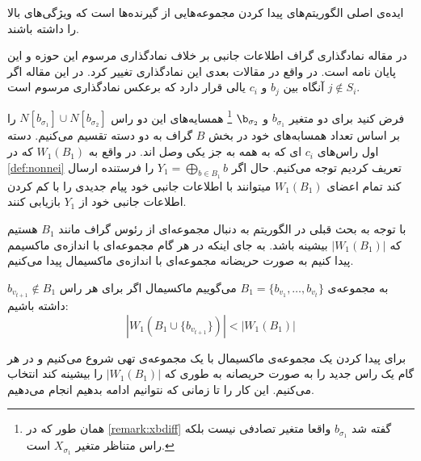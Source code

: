 ایده‌ی اصلی الگوریتم‌های
 پیدا کردن مجموعه‌هایی از گیرنده‌ها است که ویژگی‌های بالا را داشته باشند.
 
 \begin{remark}
 	در مقاله
 	\cite{pliablefirstpaper}
 	نمادگذاری گراف اطلاعات جانبی بر خلاف نمادگذاری مرسوم این حوزه و این پایان نامه است. در واقع در مقالات بعدی این نمادگذاری تغییر کرد. در این مقاله اگر
 	$j \notin S_i$
 	آنگاه بین
 	$b_j$
 	و
 	$c_i$
 	یالی قرار دارد که برعکس نمادگذاری مرسوم است.
 \end{remark}
 
 فرض کنید برای دو متغیر
 $b_{\sigma_1}$
 و
 $\b_{\sigma_2}$
 \footnote{
 همان طور که در
 \autoref{remark:xbdiff}
 گفته شد 
 $b_{\sigma_1}$
 واقعا متغیر تصادفی نیست بلکه راس متناظر متغیر
 $X_{\sigma_1}$
 است.
 }
 همسایه‌های این دو راس
 $N[b_{\sigma_1}] \cup N[b_{\sigma_2}]$
 را بر اساس تعداد همسابه‌های خود در بخش
 $B$
 گراف به دو دسته تقسیم می‌کنیم. دسته اول راس‌های
 $c_i$
 ای که به همه به جز یکی وصل اند. در واقع به
 $W_1(B_1)$
 که در
 \autoref{def:nonnei}
 تعریف کردیم توجه می‌کنیم.  حال اگر
  $Y_1 = \bigoplus\limits_{b \in B_1} b$
  را فرستنده ارسال کند تمام اعضای
  $W_1(B_1)$
  میتوانند با اطلاعات جانبی خود پیام جدیدی را با کم کردن اطلاعات جانبی خود از
  $Y_1$
  بازیابی کنند.
  
 با توجه به بحث قبلی در الگوریتم
\GRCOVone
به دنبال مجموعه‌ای از رئوس گراف مانند
$B_1$
هستیم که 
$|W_1(B_1)|$
بیشینه باشد. به جای اینکه در هر گام مجموعه‌ای با اندازه‌ی ماکسیمم پیدا کنیم به صورت حریضانه مجموعه‌ای با اندازه‌ی ماکسیمال پیدا می‌کنیم.

به مجموعه‌ی 
$B_1 = \{b_{v_1}, \ldots, b_{v_t}\}$
می‌گوییم ماکسیمال اگر برای هر راس
$b_{v_{t  +1}} \notin B_1$
داشته باشیم:
\begin{equation}
	\tag{شرط ماکسیمال بودن}
	|W_1(B_1 \cup \{b_{v_{t + 1}} \})| < |W_1(B_1)|
\end{equation}

برای پیدا کردن یک مجموعه‌ی ماکسیمال با یک مجموعه‌ی تهی شروع می‌کنیم و در هر گام یک راس جدید را به صورت حریصانه به طوری که 
$|W_1(B_1)|$
را بیشینه کند انتخاب می‌کنیم. این کار را تا زمانی که نتوانیم ادامه بدهیم انجام می‌دهیم.

